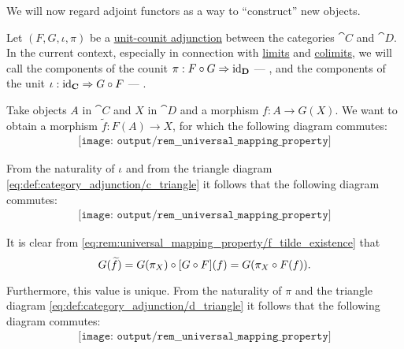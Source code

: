 \begin{remark}\label{rem:universal_mapping_property}
  We will now regard adjoint functors as a way to \enquote{construct} new objects.

  Let \( (F, G, \iota, \pi) \) be a \hyperref[def:category_adjunction/unit_counit]{unit-counit adjunction} between the categories \( \cat{C} \) and \( \cat{D} \). In the current context, especially in connection with \hyperref[def:category_of_cones/limit]{limits} and \hyperref[def:category_of_cones/colimit]{colimits}, we will call the components of the counit \( \pi: F \bincirc G \Rightarrow \id_{\cat{D}} \) --- , and the components of the unit \( \iota: \id_{\cat{C}} \Rightarrow G \bincirc F \) --- .

  Take objects \( A \) in \( \cat{C} \) and \( X \) in \( \cat{D} \) and a morphism \( f: A \to G(X) \). We want to obtain a morphism \( \widetilde{f}: F(A) \to X \), for which the following diagram commutes:
  \begin{equation}\label{eq:rem:universal_mapping_property/c_triangle}
    \begin{aligned}
      \texttt{[image: output/rem\_\_universal\_mapping\_property]}
    \end{aligned}
  \end{equation}

  From the naturality of \( \iota \) and from the triangle diagram \eqref{eq:def:category_adjunction/c_triangle} it follows that the following diagram commutes:
  \begin{equation}\label{eq:rem:universal_mapping_property/f_tilde_existence}
    \begin{aligned}
      \texttt{[image: output/rem\_\_universal\_mapping\_property]}
    \end{aligned}
  \end{equation}

  It is clear from \eqref{eq:rem:universal_mapping_property/f_tilde_existence} that
  \begin{equation*}
    G(\widetilde{f}) = G(\pi_X) \bincirc [G \bincirc F](f) = G(\pi_X \bincirc F(f)).
  \end{equation*}

  Furthermore, this value is unique. From the naturality of \( \pi \) and the triangle diagram \eqref{eq:def:category_adjunction/d_triangle} it follows that the following diagram commutes:
  \begin{equation}\label{eq:rem:universal_mapping_property/f_tilde_uniquness}
    \begin{aligned}
      \texttt{[image: output/rem\_\_universal\_mapping\_property]}
    \end{aligned}
  \end{equation}


\end{remark}
